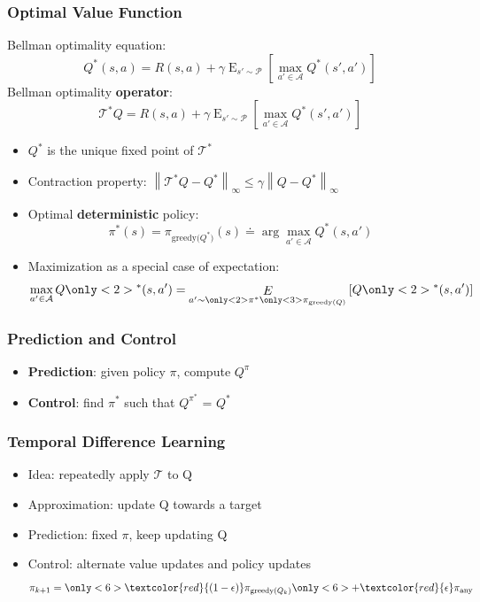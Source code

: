 \documentclass{beamer}
\newcommand{\expect}[2]{\mathop{E}_{#1}\left[#2\right]}
\newcommand{\hold}{\addtocounter{framenumber}{-1}}
\newcommand{\jump}{\addtocounter{framenumber}{1}}
\newcommand{\norm}[2][\infty]{\left\|#2\right\|_{#1}}
\begin{document}
\begin{frame}
\frametitle{Optimal Value Function}
Bellman optimality equation:
\[
	Q^*(s,a) = R(s,a) + \gamma\expect{
	s'\sim\mathcal{P}}{
	\max_{a'\in \mathcal{A}}{Q^*(s',a')}}
\]
Bellman optimality \textbf{operator}:
\[
	\mathcal{T}^*Q = 
	R(s,a) + \gamma\expect{
		s'\sim\mathcal{P}}{
	\max_{a'\in \mathcal{A}}{Q^*(s',a')}}
\]
\begin{itemize}
\item $Q^*$ is the unique fixed point of $\mathcal{T^*}$
\item Contraction property: $\norm[\infty]{\mathcal{T}^*Q-Q^*} \leq \gamma\norm[\infty]{Q-Q^*}$
\end{itemize}
\end{frame}

\begin{frame}
\begin{itemize}
\item<1-> Optimal \textbf{deterministic} policy:
\[
	\pi^*(s) =
	\pi_{\text{greedy($Q^*$)}}(s) \doteq \arg\max_{a'\in\mathcal{A}}Q^*(s,a') 
\]
\item<2->Maximization as a special case of expectation:
\[
	\max_{a' \in \mathcal{A}}Q
	\only<2>{^*}
	(s,a') = \expect{a'\sim
	\only<2>{\pi^*}
	\only<3>{\pi_{\text{greedy($Q$)}}}
	}{Q
	\only<2>{^*}
	(s,a')}
\]
\end{itemize}
\end{frame}

\hold\hold\hold
\begin{frame}
\frametitle{Prediction and Control}
\begin{itemize}
\item \textbf{Prediction}: given policy $\pi$, compute $Q^{\pi}$

\item \textbf{Control}: find $\pi^*$ such that $Q^{\pi^*}$ = $Q^*$
\end{itemize}
\end{frame}
\jump\jump

\begin{frame}
\frametitle{Temporal Difference Learning}
\begin{itemize}
\item<1-> Idea: repeatedly apply $\mathcal{T}$ to Q
\item<2-> Approximation: update Q towards a target
\item<4> Prediction: fixed $\pi$, keep updating Q
\item<5-> Control: alternate value updates and policy updates
\[
	\pi_{k+1} = \only<6>{\textcolor{red}{(1-\epsilon)}}\pi_{\text{greedy($Q_{k}$)}} \only<6>{+\textcolor{red}{\epsilon}\pi_{\text{any}}}
\]
\end{itemize}
\end{frame}
\end{document}
